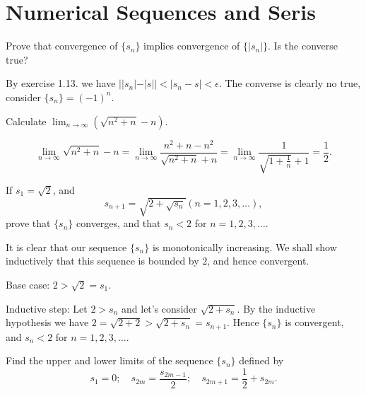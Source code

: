 \section{Numerical Sequences and Seris}


\begin{problem}
  Prove that convergence of $\{s_n\}$ implies convergence of $\{|s_n|\}$.
  Is the converse true?
\end{problem}

\begin{solution}
  By exercise 1.13. we have $||s_n| - |s|| < |s_n - s | < \epsilon$.
  The converse is clearly no true, consider $\{s_n\} = (-1)^n$.
\end{solution}

\begin{problem}
  Calculate $\lim_{n\to\infty} (\sqrt{n^2 + n} - n)$.
\end{problem}

\begin{solution}
  \[\lim_{n\to\infty} \sqrt{n^2 + n} - n = \lim_{n\to\infty} \frac{n^2 + n - n^2}{\sqrt{n^2 + n} + n} = \lim_{n\to\infty} \frac{1}{\sqrt{1 + \frac{1}{n}} + 1} = \frac{1}{2}.\]
\end{solution}

\begin{problem}
  If $s_1 = \sqrt{2}$, and
  \[s_{n + 1} = \sqrt{2 + \sqrt{s_n}}  (n = 1, 2, 3, \ldots),\]
  prove that $\{s_n\}$ converges, and that $s_n < 2$ for $n = 1, 2, 3, \ldots$.
\end{problem}

\begin{solution}
  It is clear that our sequence $\{s_n\}$ is monotonically increasing.
  We shall show inductively that this sequence is bounded by $2$, and hence convergent.

  Base case: $2 > \sqrt{2} = s_1$.

  Inductive step: Let $2 > s_n$ and let's consider $\sqrt{2 + s_n}$.
  By the inductive hypothesis we have $2 = \sqrt{2 + 2} > \sqrt{2 + s_n} = s_{n + 1}$.
  Hence $\{s_n\}$ is convergent, and $s_n < 2$ for $n = 1, 2, 3, \ldots$.
\end{solution}

\begin{problem}
  Find the upper and lower limits of the sequence $\{s_n\}$ defined by
  \[s_1 = 0;\quad s_{2m} = \frac{s_{2m - 1}}{2};\quad s_{2m + 1} = \frac{1}{2} + s_{2m}.\]
\end{problem}

